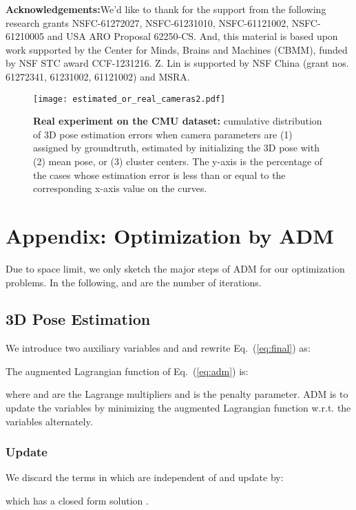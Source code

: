 \documentclass[10pt,twocolumn,letterpaper]{article}
\begin{document}
\textbf{Acknowledgements:}We'd like to thank for the support from the following research grants NSFC-61272027, NSFC-61231010, NSFC-61121002, NSFC-61210005 and USA ARO Proposal 62250-CS. And, this material is based upon work supported by the Center for Minds, Brains and Machines (CBMM), funded by NSF STC award CCF-1231216. Z. Lin is supported by NSF China (grant nos. 61272341, 61231002, 61121002) and MSRA.
\begin{figure}
\centering
\texttt{[image: estimated\_or\_real\_cameras2.pdf]}
\caption{\textbf{Real experiment on the CMU dataset:} cumulative
distribution of 3D pose estimation errors when camera parameters
are (1) assigned by groundtruth, estimated by initializing the 3D
pose with (2) mean pose, or (3)  cluster centers. The y-axis is the percentage of the cases whose estimation error is less than or equal to the corresponding x-axis value on the curves. } \vspace{-1em} \label{fig:camera}
\end{figure}

{\small


}


\section{Appendix: Optimization by ADM}
\label{sec:optimization} Due to space limit, we only sketch the
major steps of ADM for our optimization problems. In the
following,  and  are the number of iterations.

\subsection{3D Pose Estimation}
We introduce two auxiliary variables  and  and rewrite Eq.~(\ref{eq:final}) as:



The augmented Lagrangian function of  Eq.~(\ref{eq:adm}) is:

where  and  are the Lagrange multipliers and
 is the penalty parameter. ADM is to update the variables
by minimizing the augmented Lagrangian function w.r.t. the
variables alternately.

\subsubsection{Update }
We discard the terms in  which are independent of
 and update  by:

which has a closed form solution \cite{liu2013linearized}.
\end{document}
